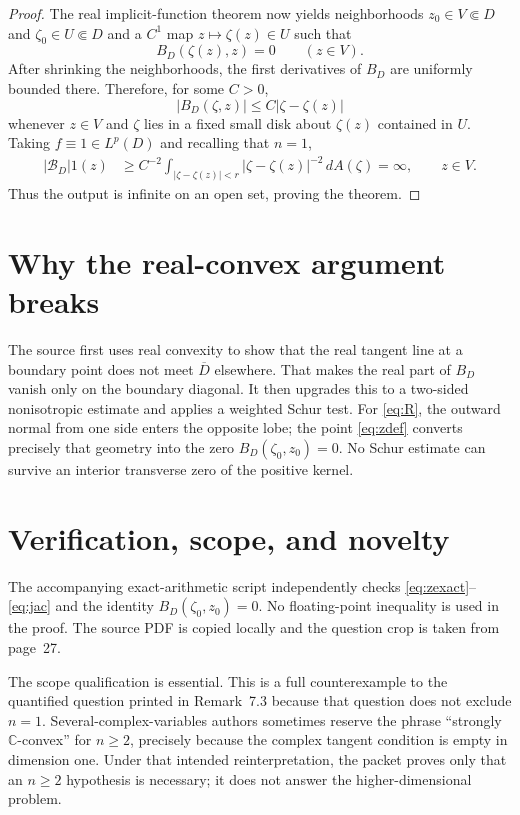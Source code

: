 \documentclass[11pt]{article}
\newcommand{\C}{\mathbb C}
\begin{document}
\begin{proof}
The real implicit-function theorem now yields neighborhoods
$z_0\in V\Subset D$ and $\zeta_0\in U\Subset D$ and a $C^1$ map
$z\mapsto\zeta(z)\in U$ such that
\[
 B_D(\zeta(z),z)=0\qquad(z\in V).
\]
After shrinking the neighborhoods, the first derivatives of $B_D$ are
uniformly bounded there.  Therefore, for some $C>0$,
\[
 |B_D(\zeta,z)|\le C|\zeta-\zeta(z)|
\]
whenever $z\in V$ and $\zeta$ lies in a fixed small disk about $\zeta(z)$
contained in $U$.  Taking $f\equiv1\in L^p(D)$ and recalling that $n=1$,
\begin{align*}
 |\mathcal B_D|1(z)
 &\ge C^{-2}\int_{|\zeta-\zeta(z)|<r}
       |\zeta-\zeta(z)|^{-2}\,dA(\zeta)=\infty,
 \qquad z\in V.
\end{align*}
Thus the output is infinite on an open set, proving the theorem.
\end{proof}

\section{Why the real-convex argument breaks}

The source first uses real convexity to show that the real tangent line at a
boundary point does not meet $\overline D$ elsewhere.  That makes the real
part of $B_D$ vanish only on the boundary diagonal.  It then upgrades this to
a two-sided nonisotropic estimate and applies a weighted Schur test.  For
\eqref{eq:R}, the outward normal from one side enters the opposite lobe; the
point \eqref{eq:zdef} converts precisely that geometry into the zero
$B_D(\zeta_0,z_0)=0$.  No Schur estimate can survive an interior transverse
zero of the positive kernel.

\section{Verification, scope, and novelty}

The accompanying exact-arithmetic script independently checks
\eqref{eq:zexact}--\eqref{eq:jac} and the identity $B_D(\zeta_0,z_0)=0$.
No floating-point inequality is used in the proof.  The source PDF is copied
locally and the question crop is taken from page~27.

The scope qualification is essential.  This is a full counterexample to the
quantified question printed in Remark~7.3 because that question does not
exclude $n=1$.  Several-complex-variables authors sometimes reserve the
phrase ``strongly $\C$-convex'' for $n\ge2$, precisely because the complex
tangent condition is empty in dimension one.  Under that intended
reinterpretation, the packet proves only that an $n\ge2$ hypothesis is
necessary; it does not answer the higher-dimensional problem.
\end{document}
